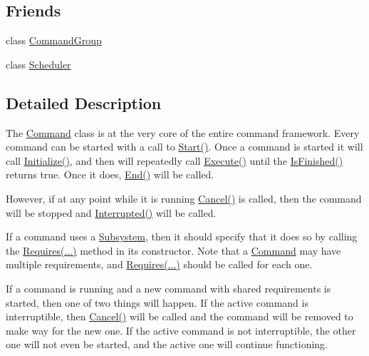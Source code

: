 \subsection*{Friends}
\begin{DoxyCompactItemize}
\item 
\hypertarget{classCommand_a74a5eec0a51871fda0db6a47a7eae304}{
class \hyperlink{classCommand_a74a5eec0a51871fda0db6a47a7eae304}{CommandGroup}}
\label{classCommand_a74a5eec0a51871fda0db6a47a7eae304}

\item 
\hypertarget{classCommand_afb88c77ea5daaefa6c8fa6bc5b9aa5c1}{
class \hyperlink{classCommand_afb88c77ea5daaefa6c8fa6bc5b9aa5c1}{Scheduler}}
\label{classCommand_afb88c77ea5daaefa6c8fa6bc5b9aa5c1}

\end{DoxyCompactItemize}


\subsection{Detailed Description}
The \hyperlink{classCommand}{Command} class is at the very core of the entire command framework. Every command can be started with a call to \hyperlink{classCommand_ad61704023f2e6acfcfda4bc88c0b77fc}{Start()}. Once a command is started it will call \hyperlink{classCommand_a35b4c5ab42d8190791863cc8f1224231}{Initialize()}, and then will repeatedly call \hyperlink{classCommand_a484c34647660fcfc8ee46b04ad5b32b6}{Execute()} until the \hyperlink{classCommand_a350a1e6657cd59f177f55e8451e60aa9}{IsFinished()} returns true. Once it does, \hyperlink{classCommand_aafdfd2fd2f1d005c20b7f9e60450dc7a}{End()} will be called.

However, if at any point while it is running \hyperlink{classCommand_af566114c4b517ef22d8c7820c171b8b2}{Cancel()} is called, then the command will be stopped and \hyperlink{classCommand_adaad5530c4dfdaac5e503ca373548a8e}{Interrupted()} will be called.

If a command uses a \hyperlink{classSubsystem}{Subsystem}, then it should specify that it does so by calling the \hyperlink{}{Requires(...)} method in its constructor. Note that a \hyperlink{classCommand}{Command} may have multiple requirements, and \hyperlink{}{Requires(...)} should be called for each one.

If a command is running and a new command with shared requirements is started, then one of two things will happen. If the active command is interruptible, then \hyperlink{classCommand_af566114c4b517ef22d8c7820c171b8b2}{Cancel()} will be called and the command will be removed to make way for the new one. If the active command is not interruptible, the other one will not even be started, and the active one will continue functioning.

